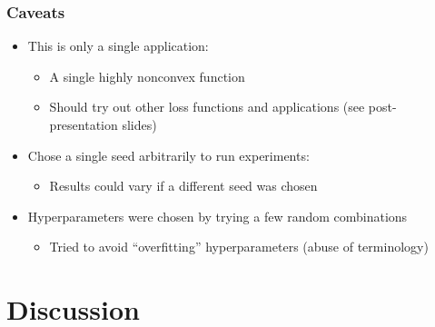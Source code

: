 \documentclass{beamer}
\begin{document}
\begin{frame}
\frametitle{Caveats}
\begin{itemize}
  \item<1-> This is only a single application:
  \begin{itemize}
    \item<1-> A single highly nonconvex function
    \item<1-> Should try out other loss functions and applications (see post-presentation slides)
  \end{itemize}
  \item<2-> Chose a single seed arbitrarily to run experiments:
  \begin{itemize}
    \item<2-> Results could vary if a different seed was chosen
  \end{itemize}
  \item<3-> Hyperparameters were chosen by trying a few random combinations
  \begin{itemize}
    \item<3-> Tried to avoid ``overfitting'' hyperparameters (abuse of terminology)
  \end{itemize}
\end{itemize}
\end{frame}

\section{Discussion}
\end{document}
